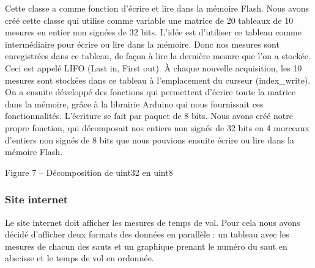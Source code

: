 Cette classe a comme fonction d'écrire et lire dans la mémoire Flash. Nous avons créé cette classe qui utilise comme variable une matrice de 20 tableaux de 10 mesures en entier non signées de 32 bits. L’idée est d’utiliser ce tableau comme intermédiaire pour écrire ou lire dans la mémoire. Donc nos mesures sont enregistrées dans ce tableau, de façon à lire la dernière mesure que l’on a stockée. Ceci est appelé LIFO (Last in, First out). À chaque nouvelle acquisition, les 10 mesures sont stockées dans ce tableau à l'emplacement du curseur (index\_write). On a ensuite développé des fonctions qui permettent d’écrire toute la matrice dans la mémoire, grâce à la librairie Arduino qui nous fournissait ces fonctionnalités. L'écriture se fait par paquet de 8 bits. Nous avons créé notre propre fonction, qui décomposait nos entiers non signés de 32 bits en 4 morceaux d’entiers non signés de 8 bits que nous pouvions ensuite écrire ou lire dans la mémoire Flash.

\begin{center}
      
    Figure 7 – Décomposition de uint32 en uint8
\end{center}

\subsubsection{Site internet}
Le site internet doit afficher les mesures de temps de vol. Pour cela nous avons décidé d'afficher deux formats des données en parallèle : un tableau avec les mesures de chacun des sauts et un graphique prenant le numéro du saut en abscisse et le temps de vol en ordonnée.

